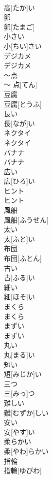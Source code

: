 \documentclass[8pt]{extreport}
\begin{document}
\begin{CJK}{UTF8}{min}
\\	高[たか]い		
\\	卵	
\\	卵[たまご]		
\\	小さい	
\\	小[ちい]さい		
\\	デジカメ	
\\	デジカメ		
\\	〜点	
\\	〜 点[てん]		
\\	豆腐	
\\	豆腐[とうふ]		
\\	長い	
\\	長[なが]い		
\\	ネクタイ	
\\	ネクタイ		
\\	バナナ	
\\	バナナ		
\\	広い	
\\	広[ひろ]い		
\\	ヒント	
\\	ヒント		
\\	風船	
\\	風船[ふうせん]		
\\	太い	
\\	太[ふと]い		
\\	布団	
\\	布団[ふとん]		
\\	古い	
\\	古[ふる]い		
\\	細い	
\\	細[ほそ]い		
\\	まくら	
\\	まくら		
\\	まずい	
\\	まずい		
\\	丸い	
\\	丸[まる]い		
\\	短い	
\\	短[みじか]い		
\\	三つ	
\\	三[みっ]つ		
\\	難しい	
\\	難[むずか]しい		
\\	安い	
\\	安[やす]い		
\\	柔らかい	
\\	柔[やわ]らかい		
\\	指輪	
\\	指輪[ゆびわ]		

\end{CJK}
\end{document}

